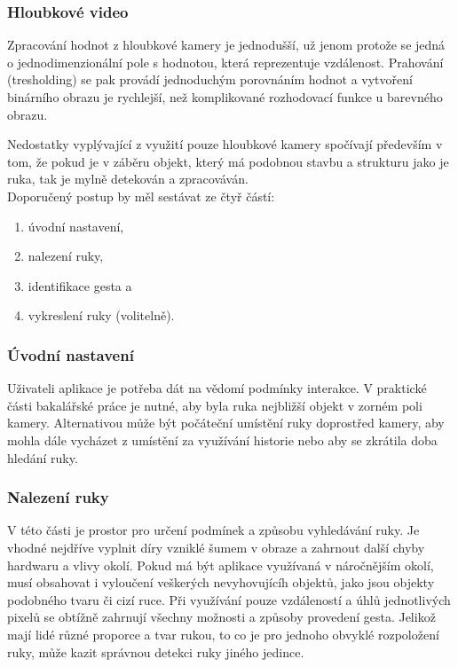\subsubsection{Hloubkové video}
Zpracování hodnot z hloubkové kamery je jednodušší, už jenom protože se jedná o jednodimenzionální pole s hodnotou, která reprezentuje vzdálenost. Prahování (tresholding) se pak provádí jednoduchým porovnáním hodnot a vytvoření binárního obrazu je rychlejší, než komplikované rozhodovací funkce u barevného obrazu.

Nedostatky vyplývající z využití pouze hloubkové kamery spočívají především v tom, že pokud je v záběru objekt, který má podobnou stavbu a strukturu jako je ruka, tak je mylně detekován a zpracováván.\\

Doporučený postup by měl sestávat ze čtyř částí:

\begin{enumerate}
\item úvodní nastavení,
\item nalezení ruky,
\item identifikace gesta a
\item vykreslení ruky (volitelně).
\end{enumerate}

\subsubsection{Úvodní nastavení}
Uživateli aplikace je potřeba dát na vědomí podmínky interakce. V praktické části bakalářské práce je nutné, aby byla ruka nejbližší objekt v zorném poli kamery. Alternativou může být počáteční umístění ruky doprostřed kamery, aby mohla dále vycházet z umístění za využívání historie nebo aby se zkrátila doba hledání ruky.

\subsubsection{Nalezení ruky}
V této části je prostor pro určení podmínek a způsobu vyhledávání ruky. Je vhodné nejdříve vyplnit díry vzniklé šumem v obraze a zahrnout další chyby hardwaru a vlivy okolí. Pokud má být aplikace využívaná v náročnějším okolí, musí obsahovat i vyloučení veškerých nevyhovujícíh objektů, jako jsou objekty podobného tvaru či cizí ruce. Při využívání pouze vzdáleností a úhlů jednotlivých pixelů se obtížně zahrnují všechny možnosti a způsoby provedení gesta. Jelikož mají lidé různé proporce a tvar rukou, to co je pro jednoho obvyklé rozpoložení ruky, může kazit správnou detekci ruky jiného jedince.

